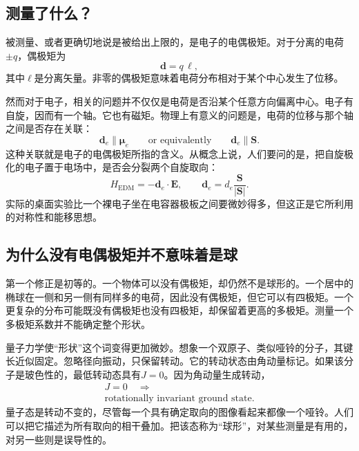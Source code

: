 \subsection{测量了什么？}

被测量、或者更确切地说是被给出上限的，是电子的电偶极矩。对于分离的电荷\(\pm q\)，偶极矩为
\begin{equation}
\mathbf d = q\,\boldsymbol{\ell},
\end{equation}
其中\(\boldsymbol{\ell}\)是分离矢量。非零的偶极矩意味着电荷分布相对于某个中心发生了位移。

然而对于电子，相关的问题并不仅仅是电荷是否沿某个任意方向偏离中心。电子有自旋，因而有一个轴。它也有磁矩。物理上有意义的问题是，电荷的位移与那个轴之间是否存在关联：
\begin{equation}
\mathbf d_e \parallel \boldsymbol{\mu}_e
\qquad \text{or equivalently} \qquad
\mathbf d_e \parallel \mathbf S .
\end{equation}
这种关联就是电子的电偶极矩所指的含义。从概念上说，人们要问的是，把自旋极化的电子置于电场中，是否会分裂两个自旋取向：
\begin{equation}
H_{\mathrm{EDM}}=-\mathbf d_e\cdot \mathbf E,
\qquad
\mathbf d_e=d_e\frac{\mathbf S}{|\mathbf S|}.
\end{equation}
实际的桌面实验比一个裸电子坐在电容器极板之间要微妙得多，但这正是它所利用的对称性和能移思想。

\subsection{为什么没有电偶极矩并不意味着是球}

第一个修正是初等的。一个物体可以没有偶极矩，却仍然不是球形的。一个居中的椭球在一侧和另一侧有同样多的电荷，因此没有偶极矩，但它可以有四极矩。一个更复杂的分布可能既没有偶极矩也没有四极矩，却保留着更高的多极矩。测量一个多极矩系数并不能确定整个形状。

量子力学使``形状''这个词变得更加微妙。想象一个双原子、类似哑铃的分子，其键长近似固定。忽略径向振动，只保留转动。它的转动状态由角动量标记。如果该分子是玻色性的，最低转动态具有\(J=0\)。因为角动量生成转动，
\begin{equation}
\begin{gathered}
J=0 \quad\Longrightarrow\\
\text{rotationally invariant ground state.}
\end{gathered}
\end{equation}
量子态是转动不变的，尽管每一个具有确定取向的图像看起来都像一个哑铃。人们可以把它描述为所有取向的相干叠加。把该态称为``球形''，对某些测量是有用的，对另一些则是误导性的。

